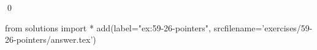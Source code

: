 
\begin{ex}
  \label{ex:59-26-pointers}
  
  \qed
\end{ex}
\begin{python0}
from solutions import *
add(label="ex:59-26-pointers",
    srcfilename='exercises/59-26-pointers/answer.tex')
\end{python0}
